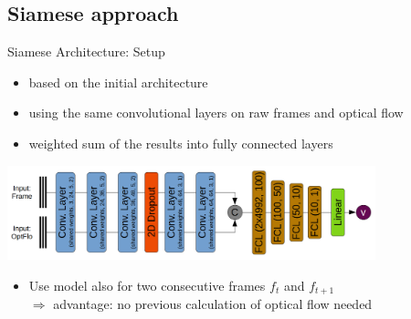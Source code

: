 \subsection{Siamese approach}

\begin{frame}{Siamese Architecture: Setup}
	\begin{itemize}
		\item based on the initial architecture
		\item using the same convolutional layers on raw frames and optical flow
		\item weighted sum of the results into fully connected layers
	\end{itemize}
	\begin{center}
	\includegraphics[width=0.8\textwidth]{imgs/siamese_model.png}
	\end{center}
	\begin{itemize}
		\item Use model also for two consecutive frames $f_t$ and $f_{t+1}$\\
		$\Rightarrow$ advantage: no previous calculation of optical flow needed
	\end{itemize}
\end{frame}

